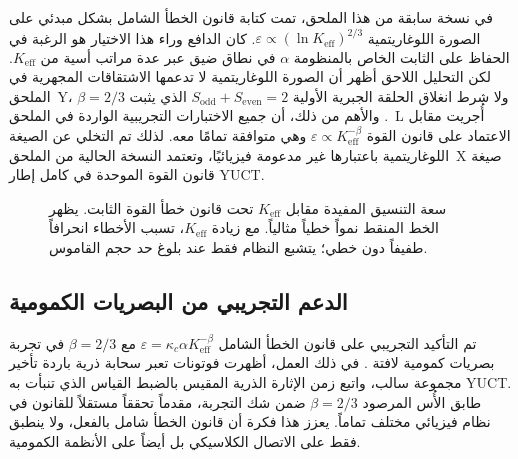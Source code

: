 \documentclass[12pt,a4paper]{article}
\theoremstyle{remark}
\begin{document}
	في نسخة سابقة من هذا الملحق، تمت كتابة قانون الخطأ الشامل بشكل مبدئي على الصورة اللوغاريتمية \( \varepsilon \propto (\ln K_{\mathrm{eff}})^{2/3} \). كان الدافع وراء هذا الاختيار هو الرغبة في الحفاظ على الثابت الخاص بالمنظومة \(\alpha\) في نطاق ضيق عبر عدة مراتب أسية من \(K_{\mathrm{eff}}\). لكن التحليل اللاحق أظهر أن الصورة اللوغاريتمية لا تدعمها الاشتقاقات المجهرية في الملحق~Y، ولا شرط انغلاق الحلقة الجبرية الأولية \(S_{\mathrm{odd}}+S_{\mathrm{even}}=2\) الذي يثبت \(\beta=2/3\) \cite{YakushevLaw2026}. والأهم من ذلك، أن جميع الاختبارات التجريبية الواردة في الملحق~L أُجريت مقابل الاعتماد على قانون القوة \(\varepsilon \propto K_{\mathrm{eff}}^{-\beta}\) وهي متوافقة تمامًا معه. لذلك تم التخلي عن الصيغة اللوغاريتمية باعتبارها غير مدعومة فيزيائيًا، وتعتمد النسخة الحالية من الملحق~X صيغة قانون القوة الموحدة في كامل إطار YUCT.
	
	\begin{otherlanguage}{english}
		\begin{figure}[htbp]
			\centering
			\caption{سعة التنسيق المفيدة مقابل \(K_{\mathrm{eff}}\) تحت قانون خطأ القوة الثابت. يظهر الخط المنقط نمواً خطياً مثالياً. مع زيادة \(K_{\mathrm{eff}}\)، تسبب الأخطاء انحرافاً طفيفاً دون خطي؛ يتشبع النظام فقط عند بلوغ حد حجم القاموس.}
			\label{fig:keff-phase}
		\end{figure}
	\end{otherlanguage}
	
	\subsection{الدعم التجريبي من البصريات الكمومية}
	تم التأكيد التجريبي على قانون الخطأ الشامل \(\varepsilon = \kappa_c \alpha K_{\mathrm{eff}}^{-\beta}\) مع \(\beta = 2/3\) في تجربة بصريات كمومية لافتة \cite{AppendixS}. في ذلك العمل، أظهرت فوتونات تعبر سحابة ذرية باردة تأخير مجموعة سالب، واتبع زمن الإثارة الذرية المقيس بالضبط القياس الذي تنبأت به YUCT. طابق الأُس المرصود \(\beta = 2/3\) ضمن شك التجربة، مقدماً تحققاً مستقلاً للقانون في نظام فيزيائي مختلف تماماً. يعزز هذا فكرة أن قانون الخطأ شامل بالفعل، ولا ينطبق فقط على الاتصال الكلاسيكي بل أيضاً على الأنظمة الكمومية.
	
\end{document}
